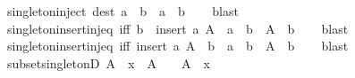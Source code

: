 \begin{isabellebody}
%
\isadelimproof
\isanewline
%
\endisadelimproof
\isanewline
{}\isamarkupfalse%
\ singleton{\isacharunderscore}{\kern0pt}inject\ {\isacharbrackleft}{\kern0pt}dest{\isacharbang}{\kern0pt}{\isacharbrackright}{\kern0pt}{\isacharcolon}{\kern0pt}\ {\isachardoublequoteopen}{\isacharbraceleft}{\kern0pt}a{\isacharbraceright}{\kern0pt}\ {\isacharequal}{\kern0pt}\ {\isacharbraceleft}{\kern0pt}b{\isacharbraceright}{\kern0pt}\ {\isasymLongrightarrow}\ a\ {\isacharequal}{\kern0pt}\ b{\isachardoublequoteclose}\isanewline
%
\isadelimproof
\ \ %
\endisadelimproof
%
\isatagproof
{}\isamarkupfalse%
\ blast%
\endisatagproof
{\isafoldproof}%
%
\isadelimproof
\isanewline
%
\endisadelimproof
\isanewline
{}\isamarkupfalse%
\ singleton{\isacharunderscore}{\kern0pt}insert{\isacharunderscore}{\kern0pt}inj{\isacharunderscore}{\kern0pt}eq\ {\isacharbrackleft}{\kern0pt}iff{\isacharbrackright}{\kern0pt}{\isacharcolon}{\kern0pt}\ {\isachardoublequoteopen}{\isacharbraceleft}{\kern0pt}b{\isacharbraceright}{\kern0pt}\ {\isacharequal}{\kern0pt}\ insert\ a\ A\ {\isasymlongleftrightarrow}\ a\ {\isacharequal}{\kern0pt}\ b\ {\isasymand}\ A\ {\isasymsubseteq}\ {\isacharbraceleft}{\kern0pt}b{\isacharbraceright}{\kern0pt}{\isachardoublequoteclose}\isanewline
%
\isadelimproof
\ \ %
\endisadelimproof
%
\isatagproof
{}\isamarkupfalse%
\ blast%
\endisatagproof
{\isafoldproof}%
%
\isadelimproof
\isanewline
%
\endisadelimproof
\isanewline
{}\isamarkupfalse%
\ singleton{\isacharunderscore}{\kern0pt}insert{\isacharunderscore}{\kern0pt}inj{\isacharunderscore}{\kern0pt}eq{\isacharprime}{\kern0pt}\ {\isacharbrackleft}{\kern0pt}iff{\isacharbrackright}{\kern0pt}{\isacharcolon}{\kern0pt}\ {\isachardoublequoteopen}insert\ a\ A\ {\isacharequal}{\kern0pt}\ {\isacharbraceleft}{\kern0pt}b{\isacharbraceright}{\kern0pt}\ {\isasymlongleftrightarrow}\ a\ {\isacharequal}{\kern0pt}\ b\ {\isasymand}\ A\ {\isasymsubseteq}\ {\isacharbraceleft}{\kern0pt}b{\isacharbraceright}{\kern0pt}{\isachardoublequoteclose}\isanewline
%
\isadelimproof
\ \ %
\endisadelimproof
%
\isatagproof
{}\isamarkupfalse%
\ blast%
\endisatagproof
{\isafoldproof}%
%
\isadelimproof
\isanewline
%
\endisadelimproof
\isanewline
{}\isamarkupfalse%
\ subset{\isacharunderscore}{\kern0pt}singletonD{\isacharcolon}{\kern0pt}\ {\isachardoublequoteopen}A\ {\isasymsubseteq}\ {\isacharbraceleft}{\kern0pt}x{\isacharbraceright}{\kern0pt}\ {\isasymLongrightarrow}\ A\ {\isacharequal}{\kern0pt}\ {\isacharbraceleft}{\kern0pt}{\isacharbraceright}{\kern0pt}\ {\isasymor}\ A\ {\isacharequal}{\kern0pt}\ {\isacharbraceleft}{\kern0pt}x{\isacharbraceright}{\kern0pt}{\isachardoublequoteclose}\isanewline

\end{isabellebody}

